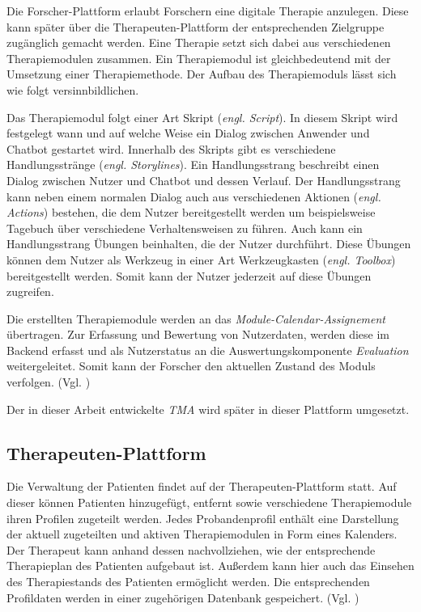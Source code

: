 Die Forscher-Plattform erlaubt Forschern eine digitale Therapie anzulegen. Diese kann später über die Therapeuten-Plattform der entsprechenden Zielgruppe zugänglich gemacht werden. Eine Therapie setzt sich dabei aus verschiedenen Therapiemodulen zusammen. Ein Therapiemodul ist gleichbedeutend mit der Umsetzung einer Therapiemethode. Der Aufbau des Therapiemoduls lässt sich wie folgt versinnbildlichen.

Das Therapiemodul folgt einer Art Skript (\emph{engl. Script}). In diesem Skript wird festgelegt wann und auf welche Weise ein Dialog zwischen Anwender und Chatbot gestartet wird. Innerhalb des Skripts gibt es verschiedene Handlungsstränge (\emph{engl. Storylines}). Ein Handlungsstrang beschreibt einen Dialog zwischen Nutzer und Chatbot und dessen Verlauf. Der Handlungsstrang kann neben einem normalen Dialog auch aus verschiedenen Aktionen (\emph{engl. Actions}) bestehen, die dem Nutzer bereitgestellt werden um beispielsweise Tagebuch über verschiedene Verhaltensweisen zu führen. Auch kann ein Handlungsstrang Übungen beinhalten, die der Nutzer durchführt. Diese Übungen können dem Nutzer als Werkzeug in einer Art Werkzeugkasten (\emph{engl. Toolbox}) bereitgestellt werden. Somit kann der Nutzer jederzeit auf diese Übungen zugreifen.

Die erstellten Therapiemodule werden an das \emph{Module-Calendar-Assignement} übertragen. Zur Erfassung und Bewertung von Nutzerdaten, werden diese im Backend erfasst und als Nutzerstatus an die Auswertungskomponente \emph{Evaluation} weitergeleitet. Somit kann der Forscher den aktuellen Zustand des Moduls verfolgen. (Vgl. \cite[51\psq]{benjaminhoff})

Der in dieser Arbeit entwickelte \emph{TMA} wird später in dieser Plattform umgesetzt.  


\subsection{Therapeuten-Plattform}
Die Verwaltung der Patienten findet auf der Therapeuten-Plattform statt. Auf dieser können Patienten hinzugefügt, entfernt sowie verschiedene Therapiemodule ihren Profilen zugeteilt werden. Jedes Probandenprofil enthält eine Darstellung der aktuell zugeteilten und aktiven Therapiemodulen in Form eines Kalenders. Der Therapeut kann anhand dessen nachvollziehen, wie der entsprechende Therapieplan des Patienten aufgebaut ist. Außerdem kann hier auch das Einsehen des Therapiestands des Patienten ermöglicht werden. Die entsprechenden Profildaten werden in einer zugehörigen Datenbank gespeichert. (Vgl. \cite[51\psq]{benjaminhoff})


